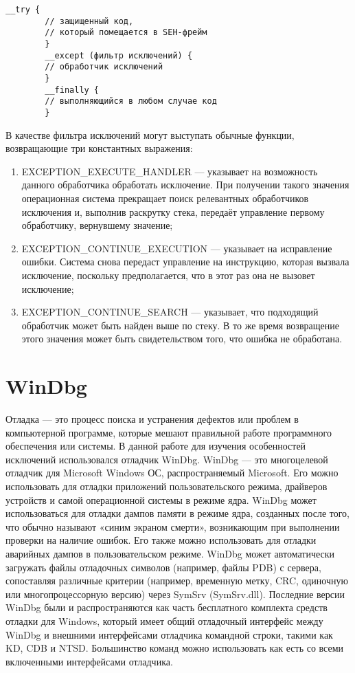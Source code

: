     \begin{lstlisting}[caption=Пример использования с языке С/С++]
        __try {
        // защищенный код,
        // который помещается в SEH-фрейм
        }
        __except (фильтр исключений) {
        // обработчик исключений
        }
        __finally {
        // выполняющийся в любом случае код
        }
    \end{lstlisting}

    В качестве фильтра исключений могут выступать обычные функции, возвращающие три константных выражения:
    \begin{enumerate}
        \item EXCEPTION\_EXECUTE\_HANDLER — указывает на возможность данного обработчика обработать исключение. При получении такого значения операционная система прекращает поиск релевантных обработчиков исключения и, выполнив раскрутку стека, передаёт управление первому обработчику, вернувшему значение;
        \item EXCEPTION\_CONTINUE\_EXECUTION — указывает на исправление ошибки. Система снова передаст управление на инструкцию, которая вызвала исключение, поскольку предполагается, что в этот раз она не вызовет исключение;
        \item EXCEPTION\_CONTINUE\_SEARCH — указывает, что подходящий обработчик может быть найден выше по стеку. В то же время возвращение этого значения может быть свидетельством того, что ошибка не обработана.
    \end{enumerate}

    \section{WinDbg}
    Отладка — это процесс поиска и устранения дефектов или проблем в компьютерной программе, которые мешают правильной работе программного обеспечения или системы.
    В данной работе для изучения особенностей исключений использовался отладчик WinDbg.
    WinDbg — это многоцелевой отладчик для Microsoft Windows ОС, распространяемый Microsoft.
    Его можно использовать для отладки приложений пользовательского режима, драйверов устройств и самой операционной системы в режиме ядра.
    WinDbg может использоваться для отладки дампов памяти в режиме ядра, созданных после того, что обычно называют «синим экраном смерти», возникающим при выполнении проверки на наличие ошибок.
    Его также можно использовать для отладки аварийных дампов в пользовательском режиме.
    WinDbg может автоматически загружать файлы отладочных символов (например, файлы PDB) с сервера, сопоставляя различные критерии (например, временную метку, CRC, одиночную или многопроцессорную версию) через SymSrv (SymSrv.dll).
    Последние версии WinDbg были и распространяются как часть бесплатного комплекта средств отладки для Windows, который имеет общий отладочный интерфейс между WinDbg и внешними интерфейсами отладчика командной строки, такими как KD, CDB и NTSD.
    Большинство команд можно использовать как есть со всеми включенными интерфейсами отладчика.

